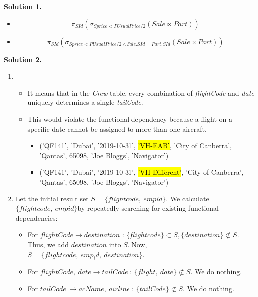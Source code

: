 \documentclass[12pt]{article}
\newcommand{\solution}[1]{\noindent \textbf{Solution #1.}}
\begin{document}
\solution{1}

  \begin{itemize}
    \item
      $$
        \pi_{SId}(\sigma_{Sprice < PUsualPrice/2}(Sale \bowtie Part))
      $$
    \item
      $$
        \pi_{SId}(\sigma_{Sprice < PUsualPrice/2 \land Sale.SId = Part.SId}(Sale \times Part))
      $$
  \end{itemize}

\solution{2}
  \begin{enumerate}
    \item
      \begin{itemize}
        \item It means that in the \textit{Crew} table, every combination of \textit{flightCode} and \textit{date} uniquely determines a single \textit{tailCode}.

        \item This would violate the functional dependency because a flight on a specific date cannot be assigned to more than one aircraft.

          \begin{itemize}
            \item ('QF141', 'Dubai', '2019-10-31', \hl{'VH-EAB'}, 'City of Canberra', 'Qantas', 65098, 'Joe Bloggs', 'Navigator')

            \item ('QF141', 'Dubai', '2019-10-31', \hl{'VH-Different'}, 'City of Canberra', 'Qantas', 65098, 'Joe Bloggs', 'Navigator')
          \end{itemize}
      \end{itemize}

    \item Let the initial result set $S = \{flightcode,\ empid\}$. We calculate $\{flightcode,\ empid\}$by repeatedly searching for existing functional dependencies:
      \begin{itemize}
        \item For $flightCode \rightarrow destination$ : $\{flightcode\} \subset S, \{destination\} \not\subset S$. Thus, we add $destination$ into $S$. Now, $S = \{flightcode,\ emp_id,\ destination\}$.

        \item For $flightCode,\ date \rightarrow tailCode$ : $\{flight,\ date\} \not\subset S$. We do nothing.

        \item For $tailCode\ \rightarrow acName,\ airline$ : $\{tailCode\} \not\subset S$. We do nothing.


\end{itemize}
\end{enumerate}
\end{document}
